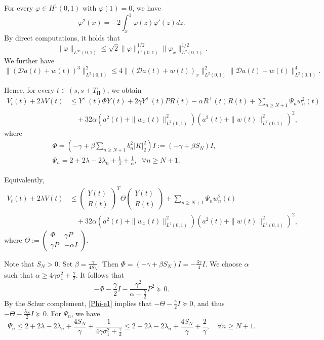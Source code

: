 \documentclass[a4paper]{article}
\numberwithin{equation}{section}
\begin{document}
For every  $\varphi\in H^1(0,1)$ with $\varphi(1)=0$, we have
$$\varphi^2(x)= -2\int_x^1\varphi(z)\varphi'(z)dz.$$
By direct computations, it holds that
\begin{equation}\label{AG610}\|\varphi\|_{L^{\infty}(0,1)}\le \sqrt{2}\|\varphi\|_{L^{2}(0,1)}^{1/2}\|\varphi_x\|_{L^{2}(0,1)}^{1/2}.\end{equation}
We further have
$$ \|(\mathcal{D}a(t)+w(t))^3\|_{L^2(0,1)}^2\le 4\|(\mathcal{D}a(t)+w(t))_x\|_{L^2(0,1)}^2\|\mathcal{D}a(t)+w(t)\|^4_{L^2(0,1)}.$$

Hence, for every $t\in (s,s+T_{\text{H}})$, we obtain
\begin{equation*}
\begin{aligned}
{V}_t(t)+2\lambda V(t)&\le Y^{\top}(t)\Phi Y(t)+2\gamma Y^{\top}(t)P R(t)-{\alpha}R^{\top}(t)R(t)+\sum_{n\ge N+1}\Psi_n w_{n}^2(t)\\
&\quad +32\alpha \left(a^2(t)+\|w_x(t)\|^2_{L^2(0,1)}\right)\left(a^2(t)+\|w(t)\|^2_{L^2(0,1)}\right)^2,
\end{aligned}
\end{equation*}
where 
\begin{equation*}
\begin{aligned}
&\Phi=(-\gamma+ \beta \sum_{n\ge N+1}b_n^2|K|_2^2)I:=(-\gamma + \beta S_{N})I,\\[2mm]
&\Psi_n=2+2\lambda-2\lambda_n+\frac{1}{\beta}+\frac{1}{\alpha},\;\;\forall n\ge N+1.
\end{aligned}
\end{equation*}

Equivalently,
$$\begin{aligned}
{V}_t(t)+2\lambda V(t)&\le \begin{pmatrix}
Y(t)\\R(t)\end{pmatrix}^T\Theta\begin{pmatrix}Y(t)\\R(t)\end{pmatrix}+\sum_{n\ge N+1}\Psi_n w_{n}^2(t)\\
&\quad +32\alpha \left(a^2(t)+\|w_x(t)\|^2_{L^2(0,1)}\right)\left(a^2(t)+\|w(t)\|^2_{L^2(0,1)}\right)^2,  \end{aligned}$$
where $\Theta:=\begin{pmatrix}
\Phi &  \gamma P\\
\gamma P  & -\alpha I
\end{pmatrix}$.

Note that $S_N>0$. Set $\beta=\frac{\gamma}{4S_{N}}$. Then 
$\Phi=(-\gamma+\beta S_N)I=-\frac{3\gamma}{4}I.$ We choose $\alpha$ such that $\alpha\ge 4\gamma \sigma^2_1+\frac{\gamma}{2}.$ It follows that 
\begin{equation}\label{Phi-e1}
-\Phi-\frac{\gamma}{2}I-\frac{\gamma^2 }{\alpha-\frac{\gamma}{2}}P^2\succeq 0.
\end{equation}
By the Schur complement, \eqref{Phi-e1} implies that $-\Theta- \frac{\gamma}{2}I\succeq0$, and thus $-\Theta- \frac{\lambda_N}{2}I\succeq0$. For $\Psi_{n}$, we have
$$\Psi_{n}\le 2+2\lambda-2\lambda_{n}+\frac{4S_{N}}{\gamma}+\frac{1}{4\gamma \sigma^2_1+\frac{\gamma}{2}}\le 2+2\lambda-2\lambda_{n}+\frac{4S_{N}}{\gamma}+\frac{2}{\gamma},\quad \forall n\ge N+1.$$
\end{document}

